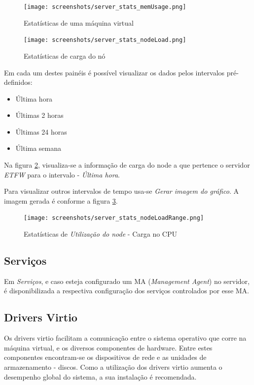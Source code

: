 \begin{figure}[H]
	\begin{center}
	\texttt{[image: screenshots/server\_stats\_memUsage.png]}
	\caption{Estatísticas de uma máquina virtual}
	\label{fig:server_stats_memUsage}
	\end{center}
\end{figure}

\begin{figure}[H]
	\begin{center}
	\texttt{[image: screenshots/server\_stats\_nodeLoad.png]}
	\caption{Estatísticas de carga do nó}
	\label{fig:server_stats_nodeLoad}
	\end{center}
\end{figure}

Em cada um destes painéis é possível visualizar os dados pelos intervalos pré-definidos:
\begin{itemize}
	\item Última hora
	\item Últimas 2 horas
	\item Últimas 24 horas
	\item Última semana
\end{itemize}

Na figura \ref{fig:server_stats_nodeLoad}, visualiza-se a informação de carga do node a que pertence o servidor \emph{ETFW} para o intervalo - \emph{Última hora}.

Para visualizar outros intervalos de tempo usa-se \emph{Gerar imagem do gráfico}. A imagem gerada é conforme a figura \ref{fig:server_stats_nodeLoadRange}.
\begin{figure}[H]
	\begin{center}
	\texttt{[image: screenshots/server\_stats\_nodeLoadRange.png]}
	\caption{Estatísticas de \emph{Utilização do node} - Carga no CPU}
	\label{fig:server_stats_nodeLoadRange}
	\end{center}
\end{figure}

\subsection{Serviços}
Em \emph{Serviços}, e caso esteja configurado um MA (\emph{Management Agent}) no servidor, é disponibilizada a respectiva configuração dos serviços controlados por esse MA.

\subsection{Drivers Virtio}
Os drivers virtio facilitam a comunicação entre o sistema operativo que corre na máquina virtual, e os diversos componentes de hardware. Entre estes componentes encontram-se os dispositivos de rede e as unidades de armazenamento - discos. Como a utilização dos drivers virtio aumenta o desempenho global do sistema, a sua instalação é recomendada.

